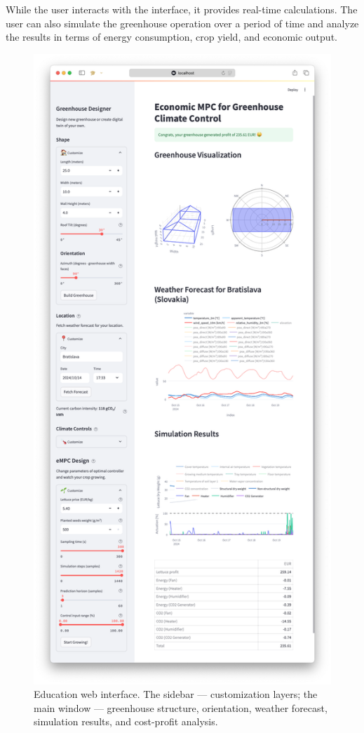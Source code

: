 \documentclass[conference]{IEEEtran}
\begin{document}
While the user interacts with the interface, it provides real-time calculations. The user can also simulate the greenhouse operation over a period of time and analyze the results in terms of energy consumption, crop yield, and economic output.

\begin{figure}\label{fig:web}
    \centering
    \includegraphics[width=\linewidth, trim=50 50 50 50]{figures/webpage.png}
    \caption{Education web interface. The sidebar ---  customization layers; the main window --- greenhouse structure, orientation, weather forecast, simulation results, and cost-profit analysis.}
\end{figure}
\end{document}
